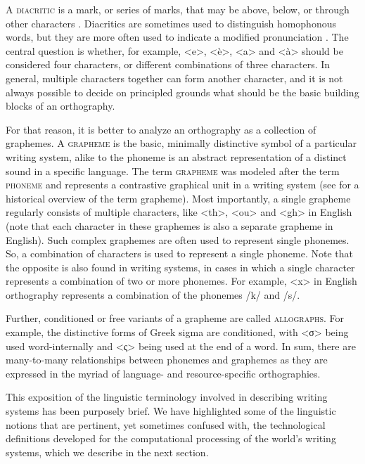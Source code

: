 A \textsc{diacritic} is a mark, or series of marks, that may be above, below, or through other characters \citep{Gaultney2002}. Diacritics are sometimes used to distinguish homophonous words, but they are more often used to indicate a modified pronunciation \citep[xli]{DanielsBright1996}. The central question is whether, for example, <e>, <è>, <a> and <à> should be considered four characters, or different combinations of three characters. In general, multiple characters together can form another character, and it is not always possible to decide on principled grounds what should be the basic building blocks of an orthography.

For that reason, it is better to analyze an orthography as a collection of graphemes. A \textsc{grapheme} is the basic, minimally distinctive symbol of a particular writing system, alike to the phoneme is an abstract representation of a distinct sound in a specific language. The term \textsc{grapheme} was modeled after the term \textsc{phoneme} and represents a contrastive graphical unit in a writing system (see \citet{Kohrt1986} for a historical overview of the term grapheme). Most importantly, a single grapheme regularly consists of multiple characters, like <th>, <ou> and <gh> in English (note that each character in these graphemes is also a separate grapheme in English). Such complex graphemes are often used to represent single phonemes. So, a combination of characters is used to represent a single phoneme. Note that the opposite is also found in writing systems, in cases in which a single character represents a combination of two or more phonemes. For example, <x> in English orthography represents a combination of the phonemes /k/ and /s/. 

Further, conditioned or free variants of a grapheme are called \textsc{allographs}. For example, the distinctive forms of Greek sigma are conditioned, with <σ> being used word-internally and <ς> being used at the end of a word. In sum, there are many-to-many relationships between phonemes and graphemes as they are expressed in the myriad of language- and resource-specific orthographies.

This exposition of the linguistic terminology involved in describing writing systems has been purposely brief. We have highlighted some of the linguistic notions that are pertinent, yet sometimes confused with, the technological definitions developed for the computational processing of the world's writing systems, which we describe in the next section.

